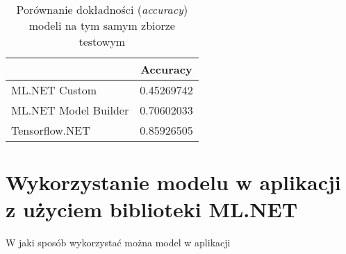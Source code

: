 \begin{table}[ht]
  \centering
  \begin{tabular}{|l|r|}
    \hline
                         & \multicolumn{1}{|c|}{Accuracy} \\
    \hline
    ML.NET Custom        & 0.45269742                     \\
    ML.NET Model Builder & 0.70602033                     \\
    Tensorflow.NET       & 0.85926505                     \\
    \hline
  \end{tabular}
  \caption[Porównanie dokładności modeli na tym samym zbiorze testowym]{Porównanie dokładności (\emph{accuracy}) modeli na tym samym zbiorze testowym}
  \label{tab:test_accuracy_comparison}
\end{table}

\section{Wykorzystanie modelu w aplikacji z użyciem biblioteki ML.NET}

W jaki sposób wykorzystać można model w aplikacji
